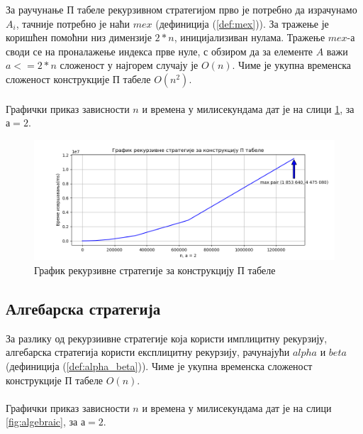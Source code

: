 \documentclass[a4paper]{article}
\begin{document}
За раучунање П табеле рекурзивном стратегијом прво је потребно да израчунамо $ A_{i} $, тачније потребно је наћи $ mex $ (дефиниција (\ref{def:mex})). За тражење је коришћен помоћни низ димензије $ 2*n $, иницијализиван нулама. Тражење $ mex $-а  своди се на проналажење индекса прве нуле, с обзиром да за елементе $ A $ важи $ a <= 2*n $ сложеност у најгорем случају је $ O(n) $. Чиме је укупна временска сложеност конструкције П табеле $ O(n^2) $.\\



\leavevmode\\
Графички приказ зависности $ n $ и времена у милисекундама дат је на слици \ref{fig:recursive}, за $ а = 2 $.

\begin{figure}[H]
	\caption{График рекурзивне стратегије за конструкцију П табеле}
	\label{fig:recursive}
	\begin{center}
		\includegraphics[width=\textwidth]{recursive.png}
	\end{center}
\end{figure}

\subsection{Алгебарска стратегија}

За разлику од рекурзиивне стратегије која користи имплицитну рекурзију, алгебарска стратегија користи експлицитну рекурзију, рачунајући $ alpha $ и $ beta $ (дефиниција (\ref{def:alpha_beta})). Чиме је укупна временска сложеност конструкције П табеле $ O(n) $.\\



\leavevmode\\
Графички приказ зависности $ n $ и времена у милисекундама дат је на слици \ref{fig:algebraic}, за $ а = 2 $.
\end{document}
